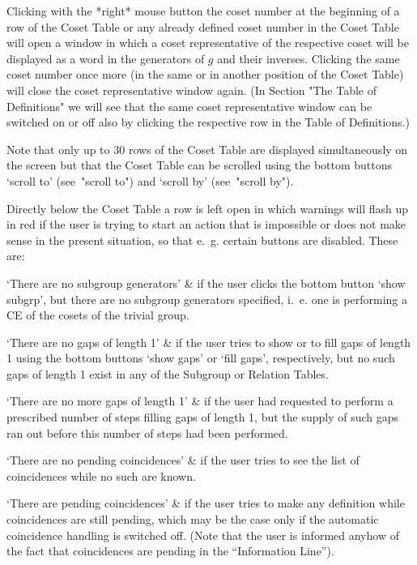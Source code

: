 Clicking with the *right* mouse button the coset number at the
beginning of a row of the Coset Table or any already defined coset
number in the Coset Table will open a window in which a coset
representative of the respective coset will be displayed as a word in
the generators of $g$ and their inverses. Clicking the same coset
number once more (in the same or in another position of the Coset
Table) will close the coset representative window again. (In Section
"The Table of Definitions" we will see that the same coset
representative window can be switched on or off also by clicking the
respective row in the Table of Definitions.)

Note that only up to 30 rows of the Coset Table are displayed
simultaneously on the screen but that the Coset Table can be scrolled
using the bottom buttons `scroll to' (see~"scroll to") and `scroll by'
(see~"scroll by").



Directly below the Coset Table a row is left open in which warnings
will flash up in red if the user is trying to start an action that is
impossible or does not make sense in the present situation, so that
e.~g. certain buttons are disabled. These are:

\beginitems

`There are no subgroup generators' &
  if the user clicks the bottom button `show subgrp', but there are no
  subgroup generators specified, i.~e. one is performing a CE of the
  cosets of the trivial group.

`There are no gaps of length 1' &
  if the user tries to show or to fill gaps of length 1 using the
  bottom buttons `show gaps' or `fill gaps', respectively, but no such
  gaps of length 1 exist in any of the Subgroup or Relation Tables.

`There are no more gaps of length 1' &
  if the user had requested to perform a prescribed number of steps
  filling gaps of length 1, but the supply of such gaps ran out before
  this number of steps had been performed.

`There are no pending coincidences' &
  if the user tries to see the list of coincidences while no such are
  known.

`There are pending coincidences' &
  if the user tries to make any definition while coincidences are still
  pending, which may be the case only if the automatic coincidence
  handling is switched off. (Note that the user is informed anyhow of
  the fact that coincidences are pending in the ``Information Line'').


